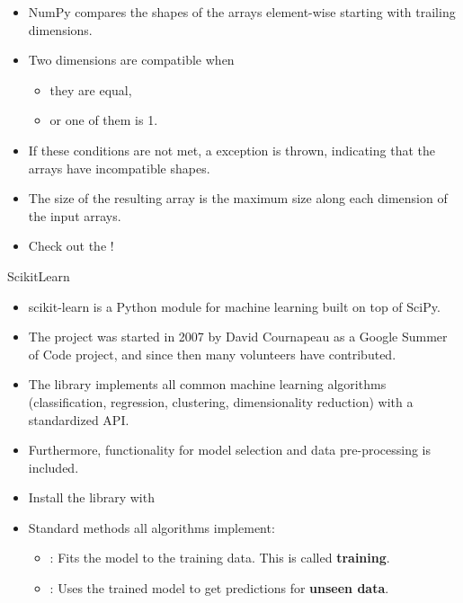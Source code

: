\begin{frame}
	\begin{itemize}
		\item NumPy compares the shapes of the arrays element-wise starting with trailing dimensions.
		\item Two dimensions are compatible when
		\begin{itemize}
			\item they are equal,
			\item or one of them is 1.
		\end{itemize}
		\item If these conditions are not met, a  exception is thrown,
			indicating that the arrays have incompatible shapes.
		\item The size of the resulting array is the maximum size along each dimension of the input arrays.
		\item Check out the !
	\end{itemize}
\end{frame}


\begin{dwHeaderFrame}{ScikitLearn}
	\begin{itemize}
		\item scikit-learn is a Python module for machine learning built on top of SciPy.
		\item The project was started in 2007 by David Cournapeau as a Google Summer of Code project, and since then many volunteers have contributed.
		\item The library implements all common machine learning algorithms (classification, regression, clustering, dimensionality reduction)
			with a standardized API.
		\item Furthermore, functionality for model selection and data pre-processing is included.
		\item Install the library with 
		\item Standard methods all algorithms implement:
		\begin{itemize}
			\item {}: Fits the model to the training data. This is called \textbf{training}.
			\item {}: Uses the trained model to get predictions for \textbf{unseen data}.
		\end{itemize}
	\end{itemize}
\end{dwHeaderFrame}


